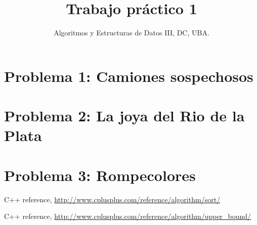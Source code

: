 \documentclass[10pt, a4paper]{article}
\author{Algoritmos y Estructuras de Datos III, DC, UBA.}
\date{}
\title{Trabajo pr\'actico 1}
\begin{document}
\maketitle

\newpage

\tableofcontents

\newpage
\section{Problema 1: Camiones sospechosos}


\newpage
\section{Problema 2: La joya del Rio de la Plata}


\newpage
\section{Problema 3: Rompecolores}


\newpage
\begin{thebibliography}{2}

  C++ reference,
  \url{http://www.cplusplus.com/reference/algorithm/sort/}
  
  C++ reference,
  \url{http://www.cplusplus.com/reference/algorithm/upper_bound/}
  
\end{thebibliography}
\end{document}
